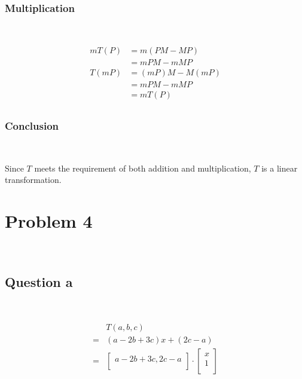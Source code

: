 \documentclass{article}
\begin{document}
\subsubsection{Multiplication}

~

\begin{equation}
\tag{3.3.2}
\begin{split}
mT(P)&=m(PM-MP)\\
&=mPM-mMP\\
T(mP)&=(mP)M-M(mP)\\
&=mPM-mMP\\
&=mT(P)\\
\end{split}
\end{equation}

\subsubsection{Conclusion}

~

Since $T$ meets the requirement of both addition and multiplication, $T$ is a linear transformation.

\newpage

\section{Problem 4}

~

\subsection{Question a}

~

\begin{equation}
\tag{4.1}
\begin{split}
&T(a,b,c)\\
=&(a-2b+3c)x+(2c-a)\\
=&\begin{bmatrix}
a-2b+3c,2c-a\\
\end{bmatrix}\cdot\begin{bmatrix}
x\\
1\\
\end{bmatrix}\\
\end{split}
\end{equation}
\end{document}
